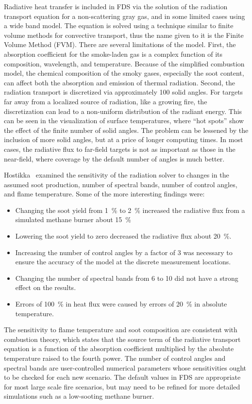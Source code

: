 \documentclass[11pt]{book}
\begin{document}
Radiative heat  transfer is  included in FDS  via the solution  of the radiation  transport equation for  a non-scattering  gray gas,  and in some
limited  cases using  a wide band  model. The equation  is solved using  a technique  similar to  finite volume  methods  for convective transport,
thus the  name given  to it  is the  Finite  Volume Method (FVM).  There  are  several  limitations  of  the  model.  First,  the absorption
coefficient  for the smoke-laden gas is  a complex function of  its  composition, wavelength, and temperature.  Because  of  the  simplified combustion  model,
the  chemical  composition of  the  smoky  gases, especially  the  soot content,  can  affect  both  the absorption  and emission  of thermal
radiation.  Second, the  radiation transport  is discretized via  approximately 100 solid angles. For  targets far away from  a  localized source  of
radiation,  like  a growing  fire,  the discretization can  lead to a non-uniform distribution  of the radiant energy. This can be seen in the
visualization of surface temperatures, where  ``hot spots'' show  the effect  of the  finite number  of solid angles. The  problem can  be lessened
by  the inclusion of  more solid angles, but at  a price of longer computing times.  In most cases, the radiative flux  to far-field targets is  not
as important  as those in the near-field, where coverage by the default number of angles is much better.

Hostikka~\cite{Hostikka:2008} examined the sensitivity of the radiation solver to changes in  the assumed soot production, number  of spectral bands, number
of control  angles, and  flame temperature.  Some of  the more interesting findings were:
\begin{itemize}
\item  Changing  the  soot  yield  from 1~\%  to  2~\%  increased  the radiative flux from a simulated methane burner about 15~\%
\item Lowering  the soot  yield to zero  decreased the  radiative flux about 20~\%.
\item Increasing  the number of  control angles by  a factor of  3 was necessary  to  ensure  the  accuracy  of the  model  at  the  discrete measurement locations.
\item Changing the number of spectral  bands from 6 to 10 did not have a strong effect on the results.
\item Errors of 100~\% in heat  flux were caused by errors of 20~\% in absolute temperature.
\end{itemize}
The  sensitivity  to  flame   temperature  and  soot  composition  are consistent with  combustion theory, which states that  the source term of the
radiative transport equation  is a function of  the absorption coefficient  multiplied  by the  absolute  temperature  raised to  the fourth  power.
The  number of  control angles  and spectral  bands are user-controlled numerical  parameters whose sensitivities  ought to be checked  for  each
new  scenario.  The  default  values  in  FDS  are appropriate for  most large scale fire  scenarios, but may  need to be refined for  more detailed
simulations  such as a  low-sooting methane burner.
\end{document}
